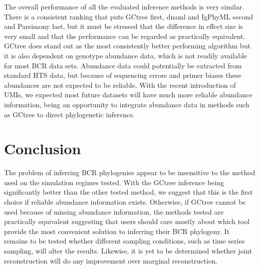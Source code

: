 The overall performance of all the evaluated inference methods is very similar.
There is a consistent ranking that puts GCtree first, dnaml and IgPhyML second and Parsimony last, but it must be stressed that the difference in effect size is very small and that the performance can be regarded as practically equivalent.
GCtree does stand out as the most consistently better performing algorithm but it is also dependent on genotype abundance data, which is not readily available for most BCR data sets.
Abundance data could potentially be extracted from standard HTS data, but because of sequencing errors and primer biases these abundances are not expected to be reliable.
With the recent introduction of UMIs, we expected most future datasets will have much more reliable abundance information, being an opportunity to integrate abundance data in methods such as GCtree to direct phylogenetic inference.




\section{Conclusion}
The problem of inferring BCR phylogenies appear to be insensitive to the method used on the simulation regimes tested.
With the GCtree inference being significantly better than the other tested method, we suggest that this is the first choice if reliable abundance information exists.
Otherwise, if GCtree cannot be used because of missing abundance information, the methods tested are practically equivalent suggesting that users should care mostly about which tool provide the most convenient solution to inferring their BCR phylogeny.
It remains to be tested whether different sampling conditions, such as time series sampling, will alter the results.
Likewise, it is yet to be determined whether joint reconstruction will do any improvement over marginal reconstruction.


